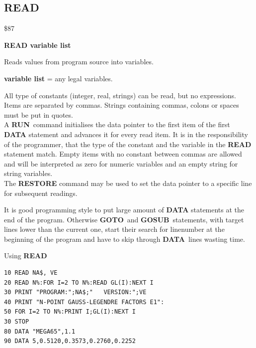 
\newpage
\subsection{READ}
\begin{description}[leftmargin=2cm,style=nextline]
\item [Token:] \$87
\item [Format:] {\bf READ variable list}
\item [Usage:]  Reads values from program source into variables.

                {\bf variable list} = any legal variables.

               All type of constants (integer, real,
               strings) can be read, but no expressions.
               Items are separated by commas.
               Strings containing commas, colons or spaces must be put
               in quotes. \\
               A {\bf RUN} command initialises the data pointer
               to the first item of the first {\bf DATA} statement
               and advances it for every read item. It is in the
               responsibility of the programmer, that the type of
               the constant and the variable in the {\bf READ}
               statement match. Empty items with no constant
               between commas are allowed and will be interpreted as
               zero for numeric variables and an empty string for
               string variables. \\
               The {\bf RESTORE} command may be used to set the
               data pointer to a specific line for subsequent
               readings.

\item [Remarks:] It is good programming style to put large amount of
               {\bf DATA} statements at the end of the program.
               Otherwise {\bf GOTO} and {\bf GOSUB} statements, with
               target lines lower than the current one,
               start their search for linenumber at the beginning of
               the program and have to skip through {\bf DATA} lines
               wasting time.
\item [Example:] Using {\bf READ}
\begin{tcolorbox}[colback=black,coltext=white]
\verbatimfont{\codefont}
\begin{verbatim}
10 READ NA$, VE
20 READ N%:FOR I=2 TO N%:READ GL(I):NEXT I
30 PRINT "PROGRAM:";NA$;"   VERSION:";VE
40 PRINT "N-POINT GAUSS-LEGENDRE FACTORS E1":
50 FOR I=2 TO N%:PRINT I;GL(I):NEXT I
30 STOP
80 DATA "MEGA65",1.1
90 DATA 5,0.5120,0.3573,0.2760,0.2252
\end{verbatim}
\end{tcolorbox}
\end{description}

